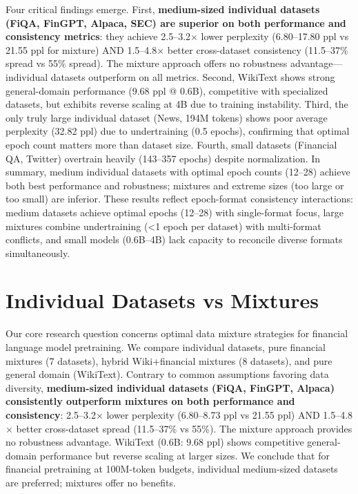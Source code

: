 Four critical findings emerge. First, \textbf{medium-sized individual datasets (FiQA, FinGPT, Alpaca, SEC) are superior on both performance and consistency metrics}: they achieve 2.5–3.2$\times$ lower perplexity (6.80–17.80 ppl vs 21.55 ppl for mixture) AND 1.5–4.8$\times$ better cross-dataset consistency (11.5–37\% spread vs 55\% spread). The mixture approach offers no robustness advantage—individual datasets outperform on all metrics. Second, WikiText shows strong general-domain performance (9.68 ppl @ 0.6B), competitive with specialized datasets, but exhibits reverse scaling at 4B due to training instability. Third, the only truly large individual dataset (News, 194M tokens) shows poor average perplexity (32.82 ppl) due to undertraining (0.5 epochs), confirming that optimal epoch count matters more than dataset size. Fourth, small datasets (Financial QA, Twitter) overtrain heavily (143–357 epochs) despite normalization. In summary, medium individual datasets with optimal epoch counts (12–28) achieve both best performance and robustness; mixtures and extreme sizes (too large or too small) are inferior. These results reflect epoch-format consistency interactions: medium datasets achieve optimal epochs (12–28) with single-format focus, large mixtures combine undertraining (<1 epoch per dataset) with multi-format conflicts, and small models (0.6B–4B) lack capacity to reconcile diverse formats simultaneously.

\section{Individual Datasets vs Mixtures}

Our core research question concerns optimal data mixture strategies for financial language model pretraining. We compare individual datasets, pure financial mixtures (7 datasets), hybrid Wiki+financial mixtures (8 datasets), and pure general domain (WikiText). Contrary to common assumptions favoring data diversity, \textbf{medium-sized individual datasets (FiQA, FinGPT, Alpaca) consistently outperform mixtures on both performance and consistency}: 2.5–3.2$\times$ lower perplexity (6.80–8.73 ppl vs 21.55 ppl) AND 1.5–4.8$\times$ better cross-dataset spread (11.5–37\% vs 55\%). The mixture approach provides no robustness advantage. WikiText (0.6B: 9.68 ppl) shows competitive general-domain performance but reverse scaling at larger sizes. We conclude that for financial pretraining at 100M-token budgets, individual medium-sized datasets are preferred; mixtures offer no benefits.

